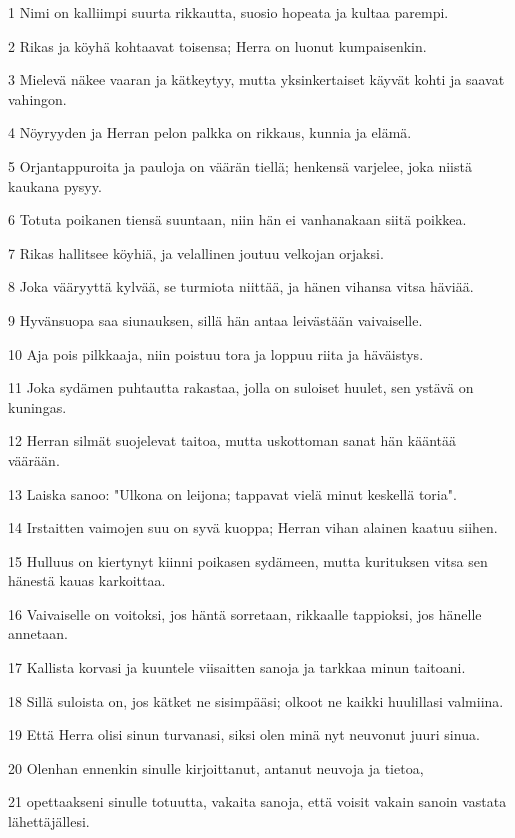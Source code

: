 \par 1 Nimi on kalliimpi suurta rikkautta, suosio hopeata ja kultaa parempi.
\par 2 Rikas ja köyhä kohtaavat toisensa; Herra on luonut kumpaisenkin.
\par 3 Mielevä näkee vaaran ja kätkeytyy, mutta yksinkertaiset käyvät kohti ja saavat vahingon.
\par 4 Nöyryyden ja Herran pelon palkka on rikkaus, kunnia ja elämä.
\par 5 Orjantappuroita ja pauloja on väärän tiellä; henkensä varjelee, joka niistä kaukana pysyy.
\par 6 Totuta poikanen tiensä suuntaan, niin hän ei vanhanakaan siitä poikkea.
\par 7 Rikas hallitsee köyhiä, ja velallinen joutuu velkojan orjaksi.
\par 8 Joka vääryyttä kylvää, se turmiota niittää, ja hänen vihansa vitsa häviää.
\par 9 Hyvänsuopa saa siunauksen, sillä hän antaa leivästään vaivaiselle.
\par 10 Aja pois pilkkaaja, niin poistuu tora ja loppuu riita ja häväistys.
\par 11 Joka sydämen puhtautta rakastaa, jolla on suloiset huulet, sen ystävä on kuningas.
\par 12 Herran silmät suojelevat taitoa, mutta uskottoman sanat hän kääntää väärään.
\par 13 Laiska sanoo: "Ulkona on leijona; tappavat vielä minut keskellä toria".
\par 14 Irstaitten vaimojen suu on syvä kuoppa; Herran vihan alainen kaatuu siihen.
\par 15 Hulluus on kiertynyt kiinni poikasen sydämeen, mutta kurituksen vitsa sen hänestä kauas karkoittaa.
\par 16 Vaivaiselle on voitoksi, jos häntä sorretaan, rikkaalle tappioksi, jos hänelle annetaan.
\par 17 Kallista korvasi ja kuuntele viisaitten sanoja ja tarkkaa minun taitoani.
\par 18 Sillä suloista on, jos kätket ne sisimpääsi; olkoot ne kaikki huulillasi valmiina.
\par 19 Että Herra olisi sinun turvanasi, siksi olen minä nyt neuvonut juuri sinua.
\par 20 Olenhan ennenkin sinulle kirjoittanut, antanut neuvoja ja tietoa,
\par 21 opettaakseni sinulle totuutta, vakaita sanoja, että voisit vakain sanoin vastata lähettäjällesi.
